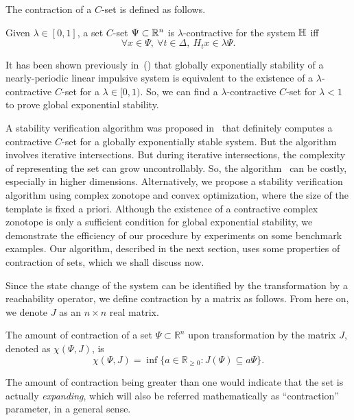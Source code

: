 The contraction of a $C$-set is defined as follows.
%
\begin{definition}
Given $\lambda\in[0,1]$, a set $C$-set $\Psi\subset\mathbb{R}^n$ is
$\lambda$-contractive for the system $\mathbb{H}$ iff
\[\forall x\in\Psi,~\forall t\in\Delta,~H_tx\in\lambda\Psi.\]
\end{definition}
%
\begin{remark} It has been shown previously
in~(\cite{2014-fiacchini-set,athanasopoulos2014alternative,AlKhatib2015})
that globally exponentially stability of a nearly-periodic linear
impulsive system is equivalent to the existence of a
$\lambda$-contractive $C$-set for a $\lambda\in[0,1)$.  So, we can
  find a $\lambda$-contractive $C$-set for $\lambda<1$ to prove  global
  exponential stability.
\end{remark}
%
  A stability verification algorithm was proposed
  in~\cite{2014-fiacchini-set} that definitely computes a contractive
  $C$-set for a globally exponentially stable system.  But the
  algorithm involves iterative intersections.  But during iterative
  intersections, the complexity of representing the set can grow
  uncontrollably.  So, the
  algorithm~\cite{2014-fiacchini-set} can be costly, especially in
  higher dimensions.  Alternatively, we propose a stability
  verification algorithm using complex zonotope and convex
  optimization, where the size of the template is fixed a priori.
  Although the existence of a contractive complex zonotope is only a
  sufficient condition for global exponential stability, we demonstrate
  the efficiency of our procedure by experiments on some benchmark
  examples.  Our algorithm, described in the next section, uses some
  properties of contraction of sets, which we shall discuss now.

Since the state change of the system can be identified by the
transformation by a reachability operator, we define contraction by
a matrix as follows.  From here on, we denote $J$ as an
$n\times n$ real matrix.
%
\begin{defn} The amount of contraction of a set
  $\Psi\subset\mathbb{R}^n$ upon transformation by the matrix $J$,
  denoted as $\chi(\Psi,J)$, is $$\chi(\Psi,J) =
  \inf\{a\in\mathbb{R}_{\geq 0} : J(\Psi)\subseteq a
  \Psi\}.$$ \end{defn}
The amount of contraction being greater than one would indicate that
the set is actually \emph{expanding}, which will also be referred
mathematically as ``contraction'' parameter, in a general sense.
%


